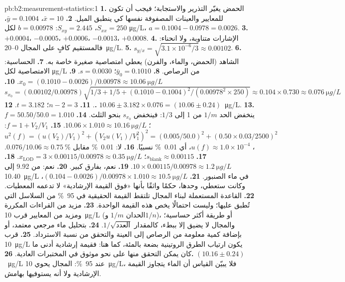 \begin{solution}{pb:b2:measurement-statistics:1}
\textbf{1.} الحمض يغيّر التذرير والاستجابة؛ فيجب أن تكون للمعايير والعينات المصفوفة
نفسها كي ينطبق الميل.
\textbf{2.} $\bar x = 10$، $\bar y = 0.1004$، $S_{xx} = 250$، $S_{xy} = 2.445$: $b = 0.00978$ لكل
\unit{\micro g/L}، $a = 0.1004 - 0.0978 = 0.0026$.
\textbf{3.} $+0.0004$، $-0.0005$، $+0.0006$، $-0.0013$، $+0.0008$.
\textbf{4.} الإشارات متناوبة، ولا انحناء: فالمستقيم كافٍ على المجال 0--\qty{20}{\micro g/L}.
\textbf{5.} $s_{y/x} = \sqrt{3.1 \times 10^{-6}/3} \approx 0.00102$.
\textbf{6.} الشاهد (الحمض، والماء، والفرن) يعطي امتصاصية صغيرة خاصة به.
\textbf{7.} الحساسية: الامتصاصية لكل \unit{\micro g/L} من الرصاص.
\textbf{8.} $\bar y_0 = 0.1010$؛ $s = 0.0030$.
\textbf{9.} $x_0 = (0.1010 - 0.0026)/0.00978 \approx \qty{10.06}{\micro g/L}$.
\textbf{10.} $s_{x_0} = (0.00102/0.00978)\sqrt{1/3 + 1/5 + (0.1010 - 0.1004)^2/(0.00978^2 \times 250)}
\approx 0.104 \times 0.730 \approx \qty{0.076}{\micro g/L}$.
\textbf{11.} $n - 2 = 3$؛ $t = 3.182$.
\textbf{12.} $10.06 \pm 3.182 \times 0.076 = (10.06 \pm 0.24)$~\unit{\micro g/L}.
\textbf{13.} ينخفض الحد $1/m$ من 1 إلى $1/3$: فينخفض $s_{x_0}$ بنحو الثلث.
\textbf{14.} $f = 50.50/50.0 = 1.010$؛ $10.06 \times 1.010 \approx \qty{10.16}{\micro g/L}$.
\textbf{15.} $f = 1 + V_2/V_1$: $u^2(f) = (u(V_2)/V_1)^2 + (V_2u(V_1)/V_1^2)^2 = (0.005/50.0)^2 +
(0.50 \times 0.03/2500)^2$، $u(f) \approx 1.0 \times 10^{-4}$، أي 0.01~\% نسبيًا.
\textbf{16.} لا: 0.01~\% مقابل $0.076/10.06 \approx 0.75~\%$.
\textbf{17.} $s_{\mathrm{blank}} \approx 0.00115$؛ $x_{\mathrm{LOD}} = 3 \times 0.00115/0.00978 \approx
\qty{0.35}{\micro g/L}$.
\textbf{18.} $10 \times 0.00115/0.00978 \approx \qty{1.2}{\micro g/L}$.
\textbf{19.} نعم، بفارق كبير.
\textbf{20.} نعم: من 9.92 إلى \qty{10.40}{\micro g/L} في ماء الصنبور.
\textbf{21.} $(0.104 - 0.0026)/0.00978 \times 1.010 \approx \qty{10.5}{\micro g/L}$، وكانت ستعطي، وحدها،
حكمًا واثقًا بأنها «فوق القيمة الإرشادية» لا تدعمه المعطيات.
\textbf{22.} القاعدة المستعملة لبناء المجال تلتقط القيمة الحقيقية في 95~\% من السلاسل التي
تُطبق عليها؛ وليست احتمالًا يخص هذه القيمة الواحدة.
\textbf{23.} مزيد من القراءات المكررة ومزيد من المعايير قرب \qty{10}{\micro g/L} (الحدان $1/m$ 
و$1/n$)، أو طريقة أكثر حساسية؛ والمجال لا يضيق إلا ببطء، كالمقدار $1/\sqrt{\text{العدد}}$.
\textbf{24.} بتحليل ماء مرجعي معتمد، أو بإضافة كمية معلومة من الرصاص إلى العينة
والتحقق من نسبة الاسترداد.
\textbf{25.} قرب \qty{10}{\micro g/L} يكون ارتياب الطرق الروتينية بضعة بالمئة، كما هنا: فقيمة إرشادية
أدنى ما كان يمكن التحقق منها على نحو موثوق في المختبرات العادية.
\textbf{26.} $\boldsymbol{(10.16 \pm 0.24)}$~\unit{\micro g/L} عند 95~\%: المجال يحوي
\qty{10}{\micro g/L}، فلا يبيّن القياس أن الماء يتجاوز القيمة الإرشادية ولا أنه يستوفيها
بهامش.
\end{solution}
